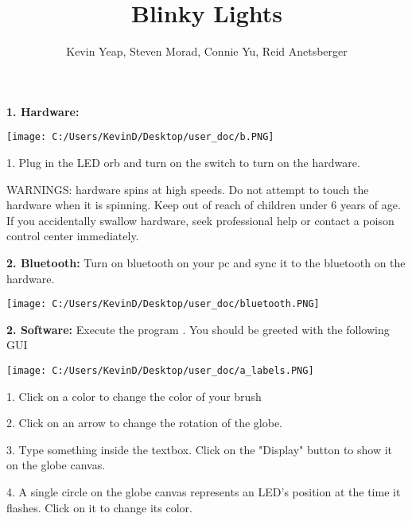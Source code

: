 \documentclass[12pt, a4paper]{ article}
\date{}
\begin{document}
 
\title{Blinky Lights} 
\author{Kevin Yeap, Steven Morad, Connie Yu, Reid Anetsberger}
\maketitle 

\noindent
\textbf{1. Hardware:} 

\vspace{1cm}

\texttt{[image: C:/Users/KevinD/Desktop/user\_doc/b.PNG]}


\vspace {1cm }
1. Plug in the LED orb and turn on the switch to turn on the hardware.

\indent

WARNINGS: hardware spins at high speeds. Do not attempt to touch the hardware when it is spinning. 
Keep out of reach of children under 6 years of age. If you accidentally swallow hardware, seek professional help or contact a poison control center immediately.


\vspace{10cm}





\textbf{2. Bluetooth:} Turn on bluetooth on your pc and sync it to the bluetooth on the hardware. 

\indent

\texttt{[image: C:/Users/KevinD/Desktop/user\_doc/bluetooth.PNG]}


\vspace{20cm}
\indent

\textbf{2. Software:} Execute the program . You should be greeted with the following GUI 

\indent

\texttt{[image: C:/Users/KevinD/Desktop/user\_doc/a\_labels.PNG]}
\vspace{1cm}

1. Click on a color to change the color of your brush
\vspace{1cm}

2. Click on an arrow to change the rotation of the globe.
\vspace{1cm}

3. Type something inside the textbox. Click on the "Display" button to show it on the globe canvas.
\vspace{1cm}

4. A single circle on the globe canvas represents an LED's position  at the time it flashes. Click on it to change its color.
\end{document}
